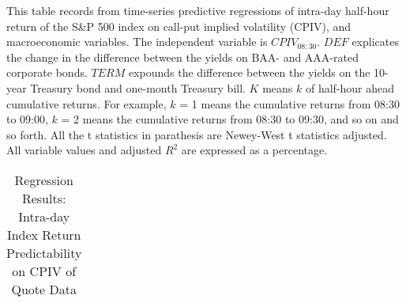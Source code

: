 


\begin{table}[h]

\caption{Regression Results: Intra-day Index Return Predictability on CPIV of Quote Data}\label{table:regression4}
\begin{threeparttable}

\medskip
\begin{spacing}{1.1}
{\footnotesize  
This table records from time-series predictive regressions of intra-day half-hour return of the S\&P 500 index on call-put implied volatility (CPIV), and macroeconomic variables. The independent variable is $CPIV_{08:30}$. $DEF$ explicates the change in the difference between the yields on BAA- and AAA-rated corporate bonds. $TERM$ expounds the difference between the yields on the 10-year Treasury bond and one-month Treasury bill. $K$ means $k$ of half-hour ahead cumulative returns. For example, $k$ = 1 means the cumulative returns from 08:30 to 09:00, $k$ = 2 means the cumulative returns from 08:30 to 09:30, and so on and so forth. All the t statistics in parathesis are Newey-West t statistics adjusted. All variable values and adjusted $R^{2}$ are expressed as a percentage.  
}
\end{spacing}
\medskip
\bigskip
\footnotesize

\begin{tabular}{ccccccccccccccc}
\toprule


\end{tabular}
\end{threeparttable}
\end{table}
